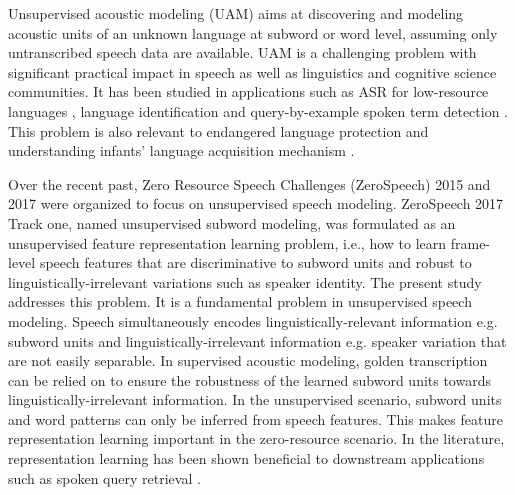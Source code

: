 \documentclass[a4paper]{article}
\begin{document}
Unsupervised acoustic modeling (UAM) aims at discovering and modeling acoustic units  of an unknown language at subword or word level, assuming only untranscribed speech data are available.
UAM is a challenging problem with significant practical impact in speech  as well as linguistics and cognitive science communities. It has been studied in applications  such as ASR for low-resource languages \cite{I3EWang}, language identification \cite{li2007vector} and query-by-example spoken term detection \cite{Chen+2016}. This problem is also relevant to
endangered language protection \cite{jansen2013summary} and  understanding infants' language acquisition mechanism \cite{dupoux2016cognitive}. 

Over the recent past, Zero Resource Speech Challenges (ZeroSpeech) 2015 \cite{versteegh2015zero} and 2017 \cite{dunbar2017zero} were organized to focus on unsupervised speech modeling.
ZeroSpeech 2017 Track one, named unsupervised subword modeling,  was formulated as an unsupervised feature representation learning problem, i.e., how to learn frame-level speech features that are discriminative to subword units and robust to linguistically-irrelevant variations such as speaker identity. 
The present study addresses this problem.
It is a fundamental problem in unsupervised speech modeling.
Speech simultaneously encodes linguistically-relevant information e.g. subword units and linguistically-irrelevant information e.g. speaker variation that are not easily separable. In supervised acoustic  modeling, golden transcription can be relied on to ensure the robustness of the learned subword units towards linguistically-irrelevant information. In the unsupervised scenario, subword units and word patterns can only be  inferred from speech features. This makes feature representation learning important in the zero-resource scenario. In the literature, representation learning has been shown beneficial to downstream applications such as spoken query retrieval \cite{chen2017multitask}.
\end{document}
